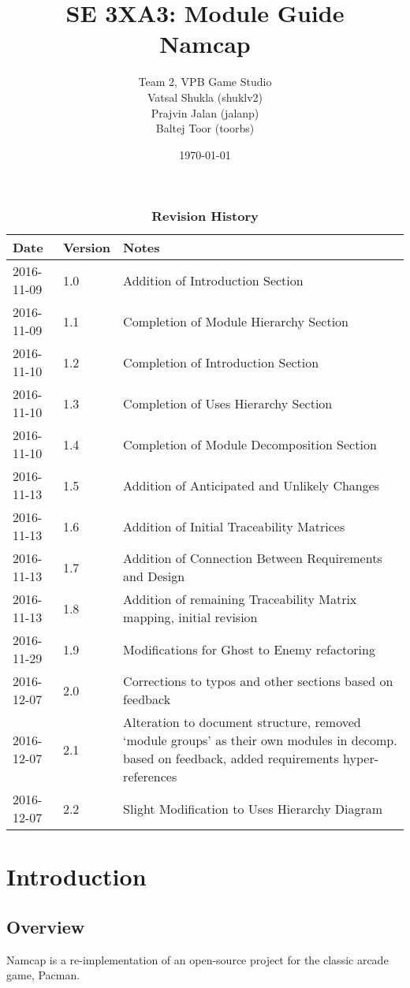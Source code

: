 \documentclass[12pt, titlepage]{article}
\title{SE 3XA3: Module Guide\\Namcap}
\author{Team 2, VPB Game Studio
		\\ Vatsal Shukla (shuklv2)
		\\ Prajvin Jalan (jalanp)
		\\ Baltej Toor (toorbs)
}
\date{\today}
\begin{document}
\maketitle

\tableofcontents
\listoftables
\listoffigures

\begin{table}[h]
\caption{\bf Revision History}
\begin{tabularx}{\textwidth}{p{3cm}p{2cm}X}
\toprule {\bf Date} & {\bf Version} & {\bf Notes}\\
\midrule
2016-11-09 & 1.0 & Addition of Introduction Section\\
2016-11-09 & 1.1 & Completion of Module Hierarchy Section\\
2016-11-10 & 1.2 & Completion of Introduction Section\\
2016-11-10 & 1.3 & Completion of Uses Hierarchy Section\\
2016-11-10 & 1.4 & Completion of Module Decomposition Section\\
2016-11-13 & 1.5 & Addition of Anticipated and Unlikely Changes\\
2016-11-13 & 1.6 & Addition of Initial Traceability Matrices\\
2016-11-13 & 1.7 & Addition of Connection Between Requirements and Design\\
2016-11-13 & 1.8 & Addition of remaining Traceability Matrix mapping, initial revision\\
2016-11-29 & 1.9 & Modifications for Ghost to Enemy refactoring\\
2016-12-07 & 2.0 & Corrections to typos and other sections based on feedback\\
2016-12-07 & 2.1 & Alteration to document structure, removed `module groups' as their own modules in decomp. based on feedback, added requirements hyper-references\\
2016-12-07 & 2.2 & Slight Modification to Uses Hierarchy Diagram\\
\bottomrule
\end{tabularx}
\end{table}

\newpage


\section{Introduction}

\subsection{Overview}
Namcap is a re-implementation of an open-source project for the classic arcade game, Pacman.
\end{document}
